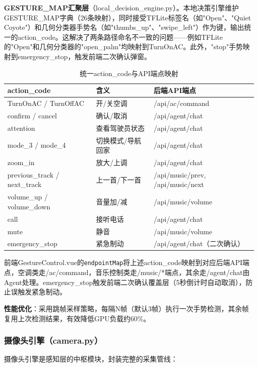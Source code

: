 \documentclass[a4paper]{article}
\begin{document}
\textbf{GESTURE\_MAP汇聚层}（local\_decision\_engine.py）。本地决策引擎维护GESTURE\_MAP字典（26条映射），同时接受TFLite标签名（如"Open"、"Quiet Coyote"）和几何分类器手势名（如"thumbs\_up"、"swipe\_left"）作为键，输出统一的action\_code。这解决了两条路径命名不一致的问题——例如TFLite的"Open"和几何分类器的"open\_palm"均映射到TurnOnAC。此外，"stop"手势映射到emergency\_stop，触发前端二次确认弹窗。

\begin{table}[H]
  \centering
  \caption{统一action\_code与API端点映射}
  \label{tab:gesture_endpoints}
  \begin{tabular}{lll}
  \toprule
  action\_code & 含义 & 后端API端点 \\
  \midrule
  TurnOnAC / TurnOffAC & 开/关空调 & /api/ac/command \\
  confirm / cancel & 确认/取消 & /api/agent/chat \\
  attention & 查看驾驶员状态 & /api/agent/chat \\
  mode\_3 / mode\_4 & 切换模式/导航回家 & /api/agent/chat \\
  zoom\_in & 放大/上调 & /api/agent/chat \\
  previous\_track / next\_track & 上一首/下一首 & /api/music/prev, /api/music/next \\
  volume\_up / volume\_down & 音量加/减 & /api/music/volume \\
  call & 接听电话 & /api/agent/chat \\
  mute & 静音 & /api/music/volume \\
  emergency\_stop & 紧急制动 & /api/agent/chat（二次确认）\\
  \bottomrule
  \end{tabular}
\end{table}

前端GestureControl.vue的\texttt{endpointMap}将上述action\_code映射到对应后端API端点，空调类走/ac/command，音乐控制类走/music/*端点，其余走/agent/chat由Agent处理。emergency\_stop触发前端二次确认覆盖层（5秒倒计时自动取消），防止误触发紧急制动。

\textbf{性能优化}：采用跳帧采样策略，每隔N帧（默认3帧）执行一次手势检测，其余帧复用上次检测结果，有效降低GPU负载约60\%。

\subsubsection{摄像头引擎（camera.py）}

摄像头引擎是感知层的中枢模块，封装完整的采集管线：
\end{document}
